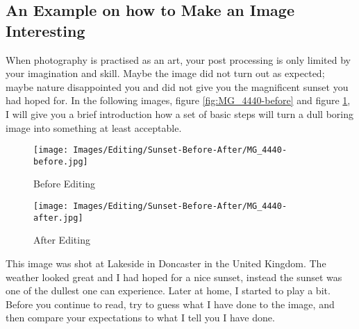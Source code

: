 \subsection{An Example on how to Make an Image Interesting}

When photography is practised as an art, your post processing is only limited by your imagination and skill. Maybe the image did not turn out as expected; maybe nature disappointed you and did not give you the magnificent sunset you had hoped for. In the following images, figure \ref{fig:MG_4440-before} and figure \ref{fig:MG_4440}, I will give you a brief introduction how a set of basic steps will turn a dull boring image into something at least acceptable.

\begin{figure}[htb]
\begin{minipage}{.5\textwidth}
	\centering
		\texttt{[image: Images/Editing/Sunset-Before-After/MG\_4440-before.jpg]}
	\caption{Before Editing}
	\label{fig:MG_4440-before}
\end{minipage}
\begin{minipage}{.5\textwidth}
	\centering
		\texttt{[image: Images/Editing/Sunset-Before-After/MG\_4440-after.jpg]}
	\caption{After Editing}
	\label{fig:MG_4440}
\end{minipage}	
\end{figure}

This image was shot at Lakeside in Doncaster in the United Kingdom. The weather looked great and I had hoped for a nice sunset, instead the sunset was one of the dullest one can experience. Later at home, I started to play a bit.
\\[\baselineskip]
Before you continue to read, try to guess what I have done to the image, and then compare your expectations to what I tell you I have done.

